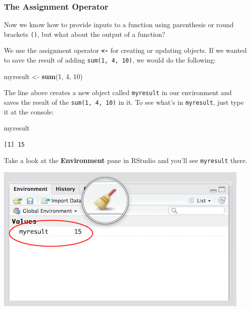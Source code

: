\documentclass[]{article}
\newenvironment{Shaded}{\begin{snugshade}}{\end{snugshade}}
\newcommand{\DecValTok}[1]{\textcolor[rgb]{0.00,0.00,0.81}{#1}}
\newcommand{\KeywordTok}[1]{\textcolor[rgb]{0.13,0.29,0.53}{\textbf{#1}}}
\newcommand{\NormalTok}[1]{#1}
\newcommand{\StringTok}[1]{\textcolor[rgb]{0.31,0.60,0.02}{#1}}
\begin{document}
\hypertarget{the-assignment-operator}{%
\subsubsection{The Assignment Operator}\label{the-assignment-operator}}

Now we know how to provide inputs to a function using parenthesis or round brackets \texttt{()}, but what about the output of a function?

We use the assignment operator \textbf{\texttt{\textless{}-}} for creating or updating objects. If we wanted to save the result of adding \texttt{sum(1,\ 4,\ 10)}, we would do the following:

\begin{Shaded}
\begin{Highlighting}[]
\NormalTok{myresult <-}\StringTok{ }\KeywordTok{sum}\NormalTok{(}\DecValTok{1}\NormalTok{, }\DecValTok{4}\NormalTok{, }\DecValTok{10}\NormalTok{)}
\end{Highlighting}
\end{Shaded}

The line above creates a new object called \texttt{myresult} in our environment and saves the result of the \texttt{sum(1,\ 4,\ 10)} in it. To see what's in \texttt{myresult}, just type it at the console:

\begin{Shaded}
\begin{Highlighting}[]
\NormalTok{myresult}
\end{Highlighting}
\end{Shaded}

\begin{verbatim}
[1] 15
\end{verbatim}

Take a look at the \textbf{Environment} pane in RStudio and you'll see \texttt{myresult} there.

\includegraphics{./img/rstudio_env.png}
\end{document}
